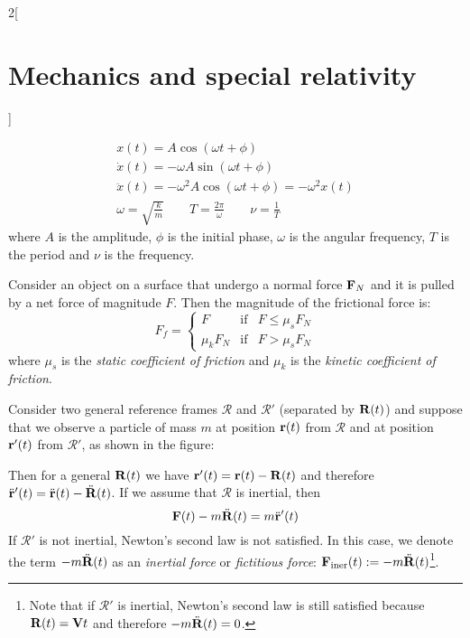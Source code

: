 \documentclass[../../../main.tex]{subfiles}
\begin{document}
\begin{multicols}{2}[\section{Mechanics and special relativity}]
\begin{prop}
\begin{gather*}
      x(t)=A\cos(\omega t+\phi)\\
      \dot{x}(t)=-\omega A\sin(\omega t+\phi)\\
      \ddot{x}(t)=-\omega^2 A\cos(\omega t+\phi)=-\omega^2x(t)\\
      \omega=\sqrt{\frac{k}{m}}\qquad T=\frac{2\pi}{\omega}\qquad\nu=\frac{1}{T}
    \end{gather*}
    where $A$ is the amplitude, $\phi$ is the initial phase, $\omega$ is the angular frequency, $T$ is the period and $\nu$ is the frequency.
  \end{prop}
  \begin{prop}
    Consider an object on a surface that undergo a normal force $\vb{F}_N$ and it is pulled by a net force of magnitude $F$. Then the magnitude of the frictional force is:
    $$
      F_f=\left\{
      \begin{array}{rcl}
        F        & \text{if} & F\leq\mu_sF_N \\
        \mu_kF_N & \text{if} & F>\mu_sF_N
      \end{array}\right.
    $$
    where $\mu_s$ is the \textit{static coefficient of friction} and $\mu_k$ is the \textit{kinetic coefficient of friction}.
  \end{prop}
  \begin{prop}
    Consider two general reference frames $\mathcal{R}$ and $\mathcal{R}'$ (separated by $\vb{R}(t)$) and suppose that we observe a particle of mass $m$ at position $\vb{r}(t)$ from $\mathcal{R}$ and at position $\vb{r}'(t)$ from $\mathcal{R}'$, as shown in the figure:
    \begin{center}
      \begin{minipage}{\linewidth}
        \centering
        
      \end{minipage}
    \end{center}
    Then for a general $\vb{R}(t)$ we have $\vb{r}'(t)=\vb{r}(t)-\vb{R}(t)$ and therefore $\ddot{\vb{r}}'(t)=\ddot{\vb{r}}(t)-\ddot{\vb{R}}(t)$. If we assume that $\mathcal{R}$ is inertial, then $$\vb{F}(t)-m\ddot{\vb{R}}(t)=m\ddot{\vb{r}}'(t)$$ If $\mathcal{R}'$ is not inertial, Newton's second law is not satisfied. In this case, we denote the term $-m\ddot{\vb{R}}(t)$ as an \textit{inertial force} or \textit{fictitious force}: $\vb{F}_\text{iner}(t):=-m\ddot{\vb{R}}(t)$\footnote{Note that if $\mathcal{R}'$ is inertial, Newton's second law is still satisfied because $\vb{R}(t)=\vb{V}t$ and therefore $-m\ddot{\vb{R}}(t)=0$.}.

\end{prop}
\end{multicols}
\end{document}
